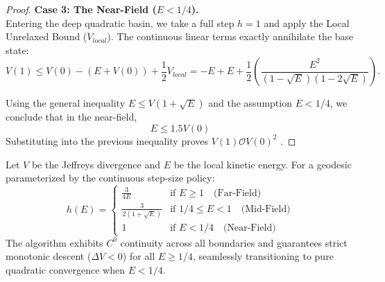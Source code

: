 \begin{proof}
\textbf{Case 3: The Near-Field ($E < 1/4$).} \\
Entering the deep quadratic basin, we take a full step $h = 1$ and apply the Local Unrelaxed Bound ($\ddot{V}_{local}$). The continuous linear terms exactly annihilate the base state:
\begin{equation}
    V(1) \le V(0) - (E + V(0)) + \frac{1}{2}\ddot{V}_{local} = -E + E + \frac{1}{2}\left( \frac{E^2}{(1-\sqrt{E})(1-2\sqrt{E})} \right).
\end{equation}

Using the general inequality $E \le V(1 + \sqrt{E})$ and the
assumption $E < 1/4$, we conclude that in the near-field,
\begin{equation}
 E \le 1.5 V(0)
\end{equation}
Substituting into the previous inequality proves $V(1) \mathcal{O} V(0)^2$ .


\end{proof}



\begin{theorem}
\label{thm:exact_unified_step}
Let $V$ be the Jeffreys divergence and $E$ be the local kinetic energy. For a geodesic parameterized by the continuous step-size policy:
\begin{equation}
    h(E) = 
    \begin{cases} 
        \frac{3}{4E} & \text{if } E \ge 1 \quad \text{(Far-Field)} \\
        \frac{3}{2(1+\sqrt{E})} & \text{if } 1/4 \le E < 1 \quad \text{(Mid-Field)} \\
        1 & \text{if } E < 1/4 \quad \text{(Near-Field)}
    \end{cases}
\end{equation}
The algorithm exhibits $C^0$ continuity across all boundaries and guarantees strict monotonic descent ($\Delta V < 0$) for all $E \ge 1/4$, seamlessly transitioning to pure quadratic convergence when $E < 1/4$.
\end{theorem}

